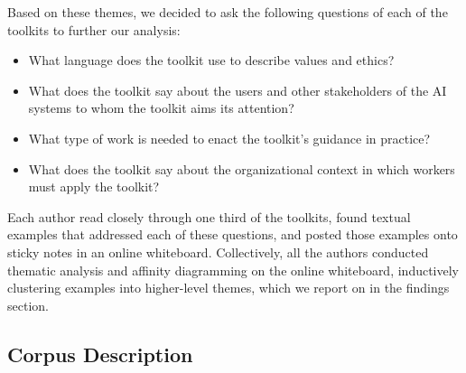 \documentclass[acmsmall]{acmart}
\begin{document}
Based on these themes, we decided to ask the following questions of each of the toolkits to further our analysis:
\begin{itemize}
    \item What language does the toolkit use to describe values and ethics?
    \item What does the toolkit say about the users and other stakeholders of the AI systems to whom the toolkit aims its attention?
    \item What type of work is needed to enact the toolkit's guidance in practice?
    \item What does the toolkit say about the organizational context in which workers must apply the toolkit?
\end{itemize}

Each author read closely through one third of the toolkits, found textual examples that addressed each of these questions, and posted those examples onto sticky notes in an online whiteboard. Collectively, all the authors conducted thematic analysis and affinity diagramming on the online whiteboard, inductively clustering examples into higher-level themes, which we report on in the findings section. 

\subsection{Corpus Description}
\label{section:corpus-description}

\end{document}
